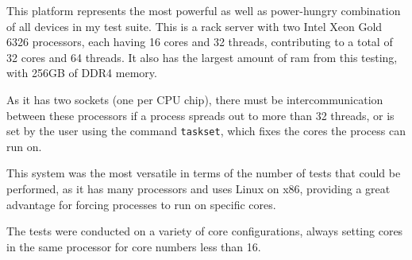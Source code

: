 This platform represents the most powerful as well as power-hungry combination of all devices in my test suite. This is a rack server with two Intel Xeon Gold 6326 processors, each having 16 cores and 32 threads, contributing to a total of 32 cores and 64 threads. It also has the largest amount of \gls{ram} from this testing, with 256GB of \gls{DDR4} memory.

As it has two sockets (one per CPU chip), there must be intercommunication between these processors if a process spreads out to more than 32 threads, or is set by the user using the command \texttt{taskset}, which fixes the cores the process can run on.


This system was the most versatile in terms of the number of tests that could be performed, as it has many processors and uses Linux on x86, providing a great advantage for forcing processes to run on specific cores.

The tests were conducted on a variety of core configurations, always setting cores in the same processor for core numbers less than 16.

